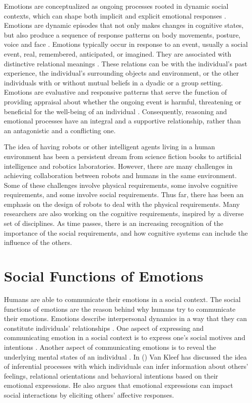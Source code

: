 \documentclass[letterpaper]{article}
\begin{document}
Emotions are conceptualized as ongoing processes rooted in dynamic social
contexts, which can shape both implicit and explicit emotional responses
\cite{parkinson:emotion-social-interaction}. Emotions are dynamic episodes that
not only makes changes in cognitive states, but also produce a sequence of
response patterns on body movements, posture, voice and face
\cite{scherer:expression-appraisal}. Emotions typically occur in response to an
event, usually a social event, real, remembered, anticipated, or imagined. They
are associated with distinctive relational meanings
\cite{parkinson:holds-emotion}. These relations can be with the individual's
past experience, the individual's surrounding objects and environment, or the
other individuals with or without mutual beliefs in a dyadic or a group setting.
Emotions are evaluative and responsive patterns that serve the function of
providing appraisal about whether the ongoing event is harmful, threatening or
beneficial for the well-being of an individual \cite{zhu:emotion-action}.
Consequently, reasoning and emotional processes have an integral and a
supportive relationship, rather than an antagonistic and a conflicting one.

The idea of having robots or other intelligent agents living in a human
environment has been a persistent dream from science fiction books to artificial
intelligence and robotics laboratories. However, there are many challenges in
achieving collaboration between robots and humans in the same environment. Some
of these challenges involve physical requirements, some involve cognitive
requirements, and some involve social requirements. Thus far, there has been an
emphasis on the design of robots to deal with the physical requirements. Many
researchers are also working on the cognitive requirements, inspired by a
diverse set of disciplines. As time passes, there is an increasing recognition
of the importance of the social requirements, and how cognitive systems can
include the influence of the others.

\section{Social Functions of Emotions}

Humans are able to communicate their emotions in a social context. The social
functions of emotions are the reason behind why humans try to communicate their
emotions. Emotions describe interpersonal dynamics in a way that they can
constitute individuals' relationships
\cite{parkinson:emotions-social,tiedens:social-life}. One aspect of expressing
and communicating emotion in a social context is to express one's social motives
and intentions \cite{hess:darwin-emotion}. Another aspect of communicating
emotions is to reveal the underlying mental states of an individual
\cite{parkinson:emotion-communication}. In
(\citeyear{kleef:emotion-regulate-social}) Van Kleef has discussed the idea of
inferential processes with which individuals can infer information about others'
feelings, relational orientations and behavioral intentions based on their
emotional expressions. He also argues that emotional expressions can impact
social interactions by eliciting others' affective responses.
\end{document}
